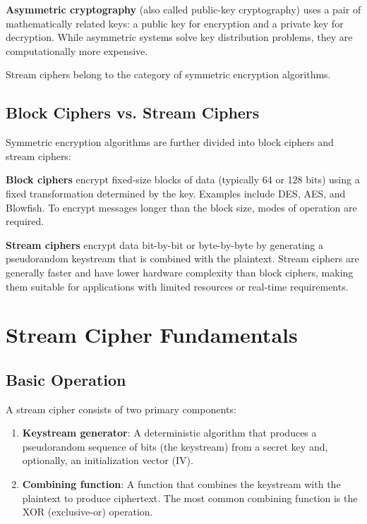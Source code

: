 \documentclass[12pt,a4paper,oneside]{report}
\begin{document}
\textbf{Asymmetric cryptography} (also called public-key cryptography) uses a pair of mathematically related keys: a public key for encryption and a private key for decryption. While asymmetric systems solve key distribution problems, they are computationally more expensive.

Stream ciphers belong to the category of symmetric encryption algorithms.

\subsection{Block Ciphers vs. Stream Ciphers}

Symmetric encryption algorithms are further divided into block ciphers and stream ciphers:

\textbf{Block ciphers} encrypt fixed-size blocks of data (typically 64 or 128 bits) using a fixed transformation determined by the key. Examples include DES, AES, and Blowfish. To encrypt messages longer than the block size, modes of operation are required.

\textbf{Stream ciphers} encrypt data bit-by-bit or byte-by-byte by generating a pseudorandom keystream that is combined with the plaintext. Stream ciphers are generally faster and have lower hardware complexity than block ciphers, making them suitable for applications with limited resources or real-time requirements.

\section{Stream Cipher Fundamentals}
\label{sec:stream-fundamentals}

\subsection{Basic Operation}

A stream cipher consists of two primary components:

\begin{enumerate}
    \item \textbf{Keystream generator}: A deterministic algorithm that produces a pseudorandom sequence of bits (the keystream) from a secret key and, optionally, an initialization vector (IV).
    
    \item \textbf{Combining function}: A function that combines the keystream with the plaintext to produce ciphertext. The most common combining function is the XOR (exclusive-or) operation.
\end{enumerate}
\end{document}
